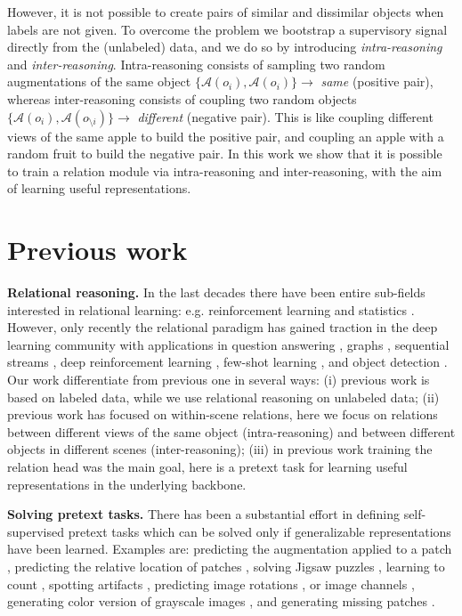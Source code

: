 \documentclass{article}
\begin{document}
However, it is not possible to create pairs of similar and dissimilar objects when labels are not given. To overcome the problem we bootstrap a supervisory signal directly from the (unlabeled) data, and we do so by introducing \emph{intra-reasoning} and \emph{inter-reasoning}. Intra-reasoning consists of sampling two random augmentations of the same object $\{\mathcal{A}(o_{i}), \mathcal{A}(o_{i}) \} \rightarrow$ \emph{same} (positive pair), whereas inter-reasoning consists of coupling two random objects $\{\mathcal{A}(o_{i}), \mathcal{A}(o_{\setminus i}) \} \rightarrow$ \emph{different} (negative pair). This is like coupling different views of the same apple to build the positive pair, and coupling an apple with a random fruit to build the negative pair.
In this work we show that it is possible to train a relation module via intra-reasoning and inter-reasoning, with the aim of learning useful representations.


\section{Previous work}\label{sec:previous_work}

\textbf{Relational reasoning.} In the last decades there have been entire sub-fields interested in relational learning: e.g. reinforcement learning \citep{dvzeroski2001relational} and statistics \citep{koller2007introduction}. However, only recently the relational paradigm has gained traction in the deep learning community with applications in question answering \citep{santoro2017simple, raposo2017discovering}, graphs \citep{battaglia2018relational}, sequential streams \citep{santoro2018relational}, deep reinforcement learning \citep{zambaldi2019deep}, few-shot learning \citep{sung2018learning}, and object detection \citep{hu2018relation}.
Our work differentiate from previous one in several ways: (i) previous work is based on labeled data, while we use relational reasoning on unlabeled data; (ii) previous work has focused on within-scene relations, here we focus on relations between different views of the same object (intra-reasoning) and between different objects in different scenes (inter-reasoning); (iii) in previous work training the relation head was the main goal, here is a pretext task for learning useful representations in the underlying backbone.

\textbf{Solving pretext tasks.} There has been a substantial effort in defining self-supervised pretext tasks which can be solved only if generalizable representations have been learned. Examples are: predicting the augmentation applied to a patch \citep{dosovitskiy2014discriminative}, predicting the relative location of patches \citep{doersch2015unsupervised}, solving Jigsaw puzzles \citep{noroozi2016unsupervised}, learning to count \citep{noroozi2017representation}, spotting artifacts \citep{jenni2018self}, predicting image rotations \citep{gidaris2018unsupervised}, or image channels \citep{zhang2017split}, generating color version of grayscale images \citep{zhang2016colorful, larsson2016learning}, and generating missing patches \citep{pathak2016context}.
\end{document}
